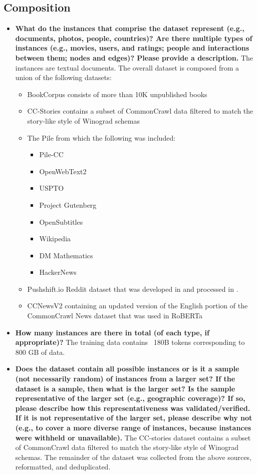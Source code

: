 \documentclass[11pt]{article}
\begin{document}
\subsection{Composition}
\begin{itemize}
    \item \textbf{What do the instances that comprise the dataset represent (e.g., documents, photos, people, countries)? Are there multiple types of instances (e.g., movies, users, and ratings; people and interactions between them; nodes and edges)? Please provide a description.} The instances are textual documents. The overall dataset is composed from a union of the following datasets:
    \begin{itemize}
        \item BookCorpus \cite{books2015} consists of more than 10K unpublished books
        \item CC-Stories \cite{ccstories2018} contains a subset of CommonCrawl data filtered to match the story-like style of Winograd schemas
        \item The Pile \cite{thepile} from which the following was included:
        \begin{itemize}
            \item Pile-CC
            \item OpenWebText2
            \item USPTO
            \item Project Gutenberg
            \item OpenSubtitles
            \item Wikipedia
            \item DM Mathematics
            \item HackerNews
        \end{itemize}
        \item Pushshift.io Reddit dataset that was developed in \citet{reddit2020} and processed in \citet{roller-etal-2021-recipes}.
        \item CCNewsV2 containing an updated version of the English portion of the CommonCrawl News dataset that was used in RoBERTa \cite{liu2019roberta}
    \end{itemize}
    \item \textbf{How many instances are there in total (of each type, if appropriate)?} The training data contains ~180B tokens corresponding to 800 GB of data.
    \item \textbf{Does the dataset contain all possible instances or is it a sample (not necessarily random) of instances from a larger set? If the dataset is a sample, then what is the larger set? Is the sample representative of the larger set (e.g., geographic coverage)? If so, please describe how this representativeness was validated/verified. If it is not representative of the larger set, please describe why not (e.g., to cover a more diverse range of instances, because instances were withheld or unavailable).} The CC-stories dataset contains a subset of CommonCrawl data filtered to match the story-like style of Winograd schemas. The remainder of the dataset was collected from the above sources, reformatted, and deduplicated.

\end{itemize}
\end{document}

